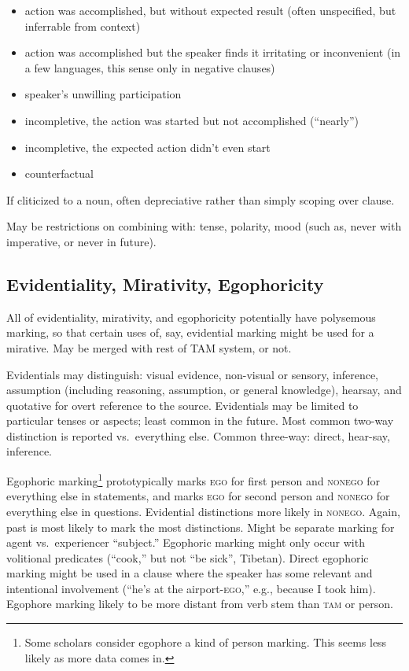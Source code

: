 \documentclass[11pt]{article}
\newcommand{\I}[1]{\textsc{#1}}   %
\newenvironment{grammarlist}%
 {\begin{itemize}\addtolength{\itemsep}{-0.5\baselineskip}\ignorespaces}%
 {\end{itemize}\ignorespacesafterend}
\begin{document}
\begin{grammarlist}
  \item action was accomplished, but without expected result (often
    unspecified, but inferrable from context)
  \item action was accomplished but the speaker finds it irritating or
    inconvenient (in a few languages, this sense only in negative clauses)
  \item speaker's unwilling participation
  \item incompletive, the action was started but not accomplished
    (``nearly'') 
  \item incompletive, the expected action didn't even start
  \item counterfactual
\end{grammarlist}

If cliticized to a noun, often depreciative rather than simply scoping
over clause.

May be restrictions on combining with: tense, polarity, mood (such as,
never with imperative, or never in future).


\subsection{Evidentiality, Mirativity, Egophoricity}
All of evidentiality, mirativity, and egophoricity potentially have
polysemous marking, so that certain uses of, say, evidential marking
might be used for a mirative.  May be merged with rest of TAM system,
or not.

Evidentials may distinguish: visual evidence, non-visual or sensory,
inference, assumption (including reasoning, assumption, or general
knowledge), hearsay, and quotative for overt reference to the source.
Evidentials may be limited to particular tenses or aspects; least
common in the future.  Most common two-way distinction is reported
vs.\ everything else.  Common three-way: direct, hear-say, inference.

Egophoric marking\footnote{Some scholars consider egophore a kind of
  person marking.  This seems less likely as more data comes in.}
prototypically marks \I{ego} for first person and \I{nonego} for
everything else in statements, and marks \I{ego} for second person and
\I{nonego} for everything else in questions.  Evidential distinctions
more likely in \I{nonego}.  Again, past is most likely to mark the
most distinctions.  Might be separate marking for agent
vs.\ experiencer ``subject.''  Egophoric marking might only occur with
volitional predicates (``cook,'' but not ``be sick'', Tibetan).
Direct egophoric marking might be used in a clause where the speaker
has some relevant and intentional involvement (``he's at the
airport-\I{ego},'' e.g., because I took him).  Egophore marking likely
to be more distant from verb stem than \I{tam} or person.
\end{document}
